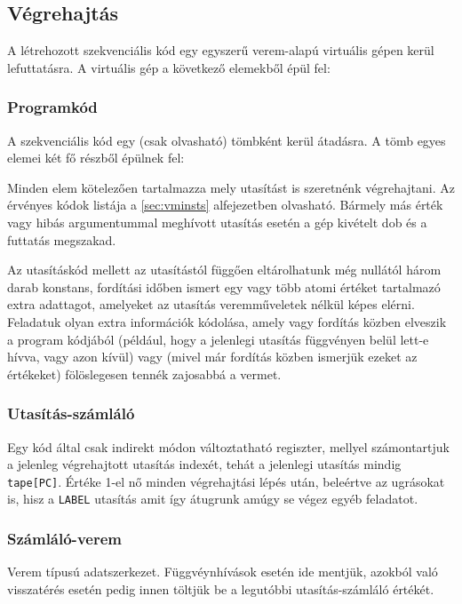 \subsection{Végrehajtás}

A létrehozott szekvenciális kód egy egyszerű verem-alapú virtuális gépen kerül lefuttatásra. A virtuális gép a következő elemekből épül fel:

\subsubsection{Programkód}

A szekvenciális kód egy (csak olvasható) tömbként kerül átadásra. A tömb egyes elemei két fő részből épülnek fel:

Minden elem kötelezően tartalmazza mely utasítást is szeretnénk végrehajtani. Az érvényes kódok listája a \ref{sec:vminsts} alfejezetben olvasható. Bármely más érték vagy hibás argumentummal meghívott utasítás esetén a gép kivételt dob és a futtatás megszakad.

Az utasításkód mellett az utasítástól függően eltárolhatunk még nullától három darab konstans, fordítási időben ismert egy vagy több atomi értéket tartalmazó extra adattagot, amelyeket az utasítás veremműveletek nélkül képes elérni. Feladatuk olyan extra információk kódolása, amely vagy fordítás közben elveszik a program kódjából (például, hogy a jelenlegi utasítás függvényen belül lett-e hívva, vagy azon kívül) vagy (mivel már fordítás közben ismerjük ezeket az értékeket) fölöslegesen tennék zajosabbá a vermet.

\subsubsection{Utasítás-számláló} 

Egy kód által csak indirekt módon változtatható regiszter, mellyel számontartjuk a jelenleg végrehajtott utasítás indexét, tehát a jelenlegi utasítás mindig \texttt{tape[PC]}. Értéke 1-el nő minden végrehajtási lépés után, beleértve az ugrásokat is, hisz a \texttt{LABEL} utasítás amit így átugrunk amúgy se végez egyéb feladatot.

\subsubsection{Számláló-verem} 

Verem típusú adatszerkezet. Függvéynhívások esetén ide mentjük, azokból való visszatérés esetén pedig innen töltjük be a legutóbbi utasítás-számláló értékét.

